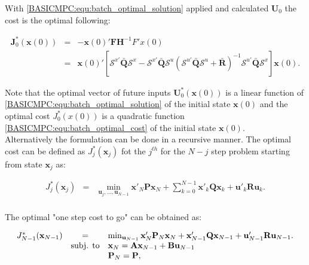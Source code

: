     With \ref{BASICMPC:equ:batch_optimal_solution} applied and calculated $\textbf{U}_0$ the cost is the optimal following:

    \begin{equation}
        \begin{array}{rcl}
        \textbf{J}^*_0(\textbf{x}(0))&=&-\textbf{x}(0)'\textbf{F}\textbf{H}^{-1}F'x(0)\\
        &=&\textbf{x}(0)'\left[ \mathcal{S}^{x'}\bar{\textbf{Q}}\mathcal{S}^{x} - \mathcal{S}^{x'}\bar{\textbf{Q}}\mathcal{S}^{u}
        (\mathcal{S}^{u'}\bar{\textbf{Q}}\mathcal{S}^{u}+\bar{\textbf{R}})^{-1}\mathcal{S}^{u'}\bar{\textbf{Q}}\mathcal{S}^{x}  \right]\textbf{x}(0).
		\end{array}
        \label{BASICMPC:equ:batch_optimal_cost}
    \end{equation}

    Note that the optimal vector of future inputs $\textbf{U}^*_0(\textbf{x}(0))$ is a linear function of \ref{BASICMPC:equ:batch_optimal_solution} of the initial state $\textbf{x}(0)$ and the optimal cost $J^*_0(x(0))$ is a quadratic function \ref{BASICMPC:equ:batch_optimal_cost} of the initial state $\textbf{x}(0)$.\\
    Alternatively the formulation can be done in a recursive manner. The optimal cost can be defined as $J^*_j(\textbf{x}_j)$ fot the $j^{th}$ for the $N-j$ step problem starting from state $\textbf{x}_j$ as:

    \begin{equation}
        \begin{array}{rcl}
         J^*_j(\textbf{x}_j)&=&\min_{\textbf{u}_j,\dots,\textbf{u}_{N-1}}\textbf{x}'_N\textbf{P}\textbf{x}_N+\sum^{N-1}_{k=0}\textbf{x}'_k\textbf{Q}\textbf{x}_k+\textbf{u}'_k\textbf{R}\textbf{u}_k.\\
        \end{array}
        \label{BASICMPC:equ:cost_function_Euclidian_recursive}
    \end{equation}

    The optimal "one step cost to go" can be obtained as:

     \begin{equation}
        \begin{array}{rcl}
         J^*_{N-1}(\textbf{x}_{N-1})&=&\min_{\textbf{u}_{N-1}}\textbf{x}'_N\textbf{P}_N\textbf{x}_N+\textbf{x}'_{N-1}\textbf{Q}\textbf{x}_{N-1}+\textbf{u}'_{N-1}\textbf{R}\textbf{u}_{N-1}.\\
          &\textnormal{subj. to}&\textbf{x}_N=\textbf{Ax}_{N-1}+\textbf{Bu}_{N-1}\\
          &&\textbf{P}_N=\textbf{P},\\
        \end{array}
        \label{BASICMPC:equ:cost_function_Euclidian_recursive_onestep}
    \end{equation}

